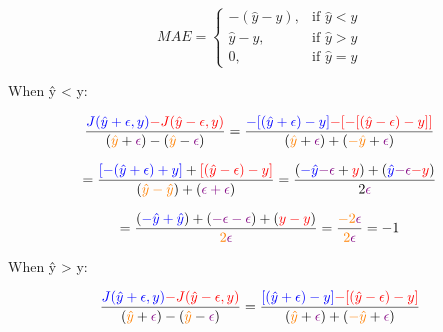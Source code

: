 \documentclass{article}
\begin{document}
\begin{equation*}
MAE = \left\{
\begin{array}{ccc}
-(\hat{y} - y), & \text{if }\hat{y} < y \\
\hat{y} - y, & \text{if }\hat{y} > y \\
0, & \text{if }\hat{y} = y
\end{array} \right.
\end{equation*}

\bigskip\bigskip\bigskip\bigskip
When ŷ \textless{} y:

\begin{displaymath}
\frac{\textcolor{blue}{J(\hat{y}+\epsilon, y)}
\textcolor{red}{-J(\hat{y}-\epsilon, y)}}
{(\textcolor{orange}{\hat{y}}+\textcolor{violet}{\epsilon})-(
\textcolor{orange}{\hat{y}}-\textcolor{violet}{\epsilon})}
=\frac{\textcolor{blue}{-[(\hat{y}+\epsilon)-y]}
\textcolor{red}{-[-[(\hat{y}-\epsilon)-y]]}}
{(\textcolor{orange}{\hat{y}}+\textcolor{violet}{\epsilon})+(
\textcolor{orange}{-\hat{y}}+\textcolor{violet}{\epsilon})}
\end{displaymath}

\begin{displaymath}
=\frac{\textcolor{blue}{[-(\hat{y}+\epsilon)+y]}+
\textcolor{red}{[(\hat{y}-\epsilon)-y]}}
{(\textcolor{orange}{\hat{y}-\hat{y}})+(\textcolor{violet}{\epsilon+\epsilon})}
=\frac{(\textcolor{blue}{-\hat{y}}\textcolor{violet}{-\epsilon}+\textcolor{red}{y})+
(\textcolor{blue}{\hat{y}}\textcolor{violet}{-\epsilon}\textcolor{red}{-y})}
{2\textcolor{violet}{\epsilon}}
\end{displaymath}

\begin{displaymath}
=\frac{(\textcolor{blue}{-\hat{y}+\hat{y}})+(\textcolor{violet}{-\epsilon-\epsilon})+
(\textcolor{red}{y-y})}{\textcolor{orange}{2}\textcolor{violet}{\epsilon}}
=\frac{\textcolor{orange}{-2}\textcolor{violet}{\epsilon}}
{\textcolor{orange}{2}\textcolor{violet}{\epsilon}}
= -1
\end{displaymath}

\bigskip\bigskip\bigskip\bigskip
When ŷ \textgreater{} y:

\begin{displaymath}
\frac{\textcolor{blue}{J(\hat{y}+\epsilon, y)}
\textcolor{red}{-J(\hat{y}-\epsilon, y)}}
{(\textcolor{orange}{\hat{y}}+\textcolor{violet}{\epsilon})-(
\textcolor{orange}{\hat{y}}-\textcolor{violet}{\epsilon})}
=\frac{\textcolor{blue}{[(\hat{y}+\epsilon)-y]}
\textcolor{red}{-[(\hat{y}-\epsilon)-y]}}
{(\textcolor{orange}{\hat{y}}+\textcolor{violet}{\epsilon})+(
\textcolor{orange}{-\hat{y}}+\textcolor{violet}{\epsilon})}
\end{displaymath}
\end{document}
